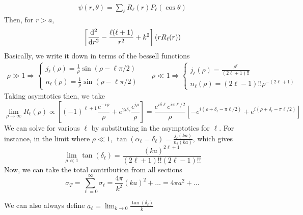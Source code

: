 \documentclass{article}
\theoremstyle{definition}
\begin{document}
\begin{align}
	\psi(r,\theta)=\sum_\ell R_\ell(r)P_\ell(\cos\theta)
\end{align}
Then, for $r>a$,
\begin{align}
	\left[\dv[2]{r}-\frac{\ell(\ell+1)}{r^2}+k^2\right](rR_\ell(r))
\end{align}
Basically, we write it down in terms of the bessell functions 
\begin{align}
	\rho\gg 1\Rightarrow\left\{\begin{matrix}
		j_\ell(\rho)=\frac{1}{\rho}\sin(\rho-\ell\pi/2)
		\\
		n_\ell(\rho)=\frac{1}{\rho}\sin(\rho-\ell\pi/2)
	\end{matrix}\right.
	&&
	\rho\ll 1\Rightarrow\left\{\begin{matrix}
		j_\ell(\rho)=\frac{\rho^{\ell}}{(2\ell+1)!!}
		\\
		n_\ell(\rho)=(2\ell-1)!!\rho^{-(2\ell+1)}
	\end{matrix}\right.
\end{align}
Taking asymtotics then, we take
\begin{equation}
	\lim_{\rho\rightarrow\infty}R_\ell(\rho)\propto
	\left[(-1)^{\ell+1}\frac{e^{-i\rho}}{\rho}+e^{2i\delta_\ell}\frac{e^{i\rho}}{\rho}\right]
	=
	\frac{e^{i\delta\ell}e^{i\pi\ell/2}}{\rho}\left[-e^{i(\rho+\delta_\ell-\pi\ell/2)}+e^{i(\rho+\delta_\ell-\pi\ell/2)}\right]
\end{equation}
We can solve for various $\ell$ by substituting in the asymptotics for $\ell$. For instance, in the limit where $\rho\ll 1$, $\tan(\alpha_\ell=\delta_\ell)=\frac{j_\ell(ka)}{n_\ell(ka)}$, which gives
\begin{equation}
	\lim_{\rho\ll 1}\tan(\delta_\ell)=\frac{(ka)^{2\ell+1}}{(2\ell+1)!!(2\ell-1)!!}
\end{equation}
Now, we can take the total contribution from all sections
\begin{equation}
	\sigma_T=\sum_{\ell=0}^\infty\sigma_\ell=\frac{4\pi}{k^2}(ka)^2+\dots=4\pi a^2+\dots
\end{equation}

We can also always define $a_\ell=\lim_{k\rightarrow 0}\frac{\tan(\delta_\ell)}{k}$
\end{document}
